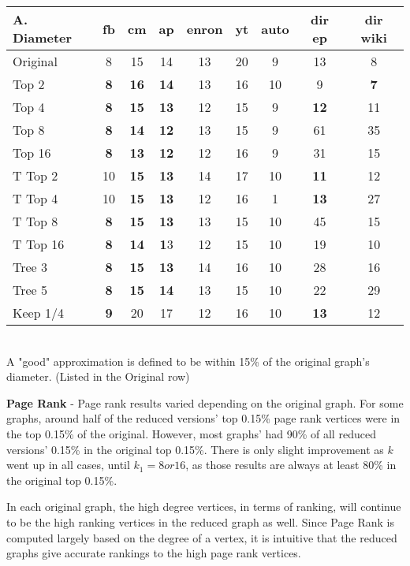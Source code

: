 \documentclass[11pt]{article}
\begin{document}
\begin{tabular}{| l | c | c | c | c | c | c | c | c |}
 \hline
 A. Diameter & fb & cm & ap & \textbf{enron} & yt & \textbf{auto} & dir ep & dir wiki \\ \hline
 Original & 8 & 15 & 14 & 13 & 20 & 9 & 13 & 8\\ \hline
 Top 2 & \textbf{8} & \textbf{16} & \textbf{14} & 13 & 16 & 10 & 9 & \textbf{7}\\ \hline
 Top 4 & \textbf{8} & \textbf{15} & \textbf{13} & 12 & 15 & 9 & \textbf{12} & 11\\ \hline
 Top 8 & \textbf{8} & \textbf{14} & \textbf{12} & 13 & 15 & 9 & 61 & 35\\ \hline
 Top 16 & \textbf{8} & \textbf{13} & \textbf{12} & 12 & 16 & 9 & 31 & 15\\ \hline
 T Top 2 & 10 & \textbf{15} & \textbf{13} & 14 & 17 & 10 & \textbf{11} & 12\\ \hline
 T Top 4 & 10 & \textbf{15} & \textbf{13} & 12 & 16 & 1 & \textbf{13} & 27\\ \hline
 T Top 8 & \textbf{8} & \textbf{15} & \textbf{13} & 13 & 15 & 10 & 45 & 15\\ \hline
 T Top 16 & \textbf{8} & \textbf{14} & \textbf{1}3 & 12 & 15 & 10 & 19 & 10\\ \hline
 Tree 3 & \textbf{8} & \textbf{15} & \textbf{13} & 14 & 16 & 10 & 28 & 16\\ \hline
 Tree 5 & \textbf{8} & \textbf{15} & \textbf{14} & 13 & 15 & 10 & 22 & 29\\ \hline
 Keep 1/4 & \textbf{9} & 20 & 17 & 12 & 16 & 10 & \textbf{13} & 12\\ \hline
 
\end{tabular}\\
A "good" approximation is defined to be within 15\% of the original graph's diameter. (Listed in the Original row)

\textbf{Page Rank} - Page rank results varied depending on the original graph.  For some graphs, around half of the reduced versions' top 0.15\% page rank vertices were in the top 0.15\% of the original. However, most graphs' had 90\% of all reduced versions' 0.15\% in the original top 0.15\%.  There is only slight improvement as $k$ went up in all cases, until $k_1 = 8 or 16$, as those results are always at least 80\% in the original top 0.15\%.

In each original graph, the high degree vertices, in terms of ranking, will continue to be the high ranking vertices in the reduced graph as well.  Since Page Rank is computed largely based on the degree of a vertex, it is intuitive that the reduced graphs give accurate rankings to the high page rank vertices.
\end{document}
